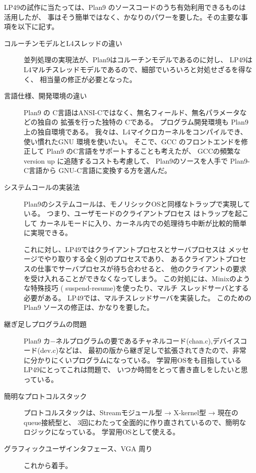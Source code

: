    LP49の試作に当たっては、Plan9 のソースコードのうち有効利用できるものは活用したが、
   事はそう簡単ではなく、かなりのパワーを要した。その主要な事項を以下に記す。
    

\begin{description}
\item[コルーチンモデルとL4スレッドの違い]
      並列処理の実現法が、Plan9はコルーチンモデルであるのに対し、
      LP49はL4マルチスレッドモデルであるので、細部でいろいろと対処せざるを得なく、
      相当量の修正が必要となった。
    
\item[言語仕様、開発環境の違い]
      Plan9 の C言語はANSI-Cではなく、無名フィールド、無名パラメータなどの独自の
      拡張を行った独特の Cである。
    プログラム開発環境も Plan9 上の独自環境である。
    我々は、L4マイクロカーネルをコンパイルでき、使い慣れたGNU 環境を使いたい。
    そこで、GCC のフロントエンドを修正して Plan9 のC言語をサポートすることも考えたが、
    GCCの頻繁な version up に追随するコストも考慮して、
    Plan9のソースを人手で Plan9-C言語から GNU-C言語に変換する方を選んだ。
    
\item[システムコールの実装法]
      Plan9のシステムコールは、モノリシックOSと同様なトラップで実現している。
      つまり、ユーザモードのクライアントプロセス はトラップを起こして
      カーネルモードに入り、カーネル内での処理待ち中断が比較的簡単に実現できる。

    これに対し、LP49ではクライアントプロセスとサーバプロセスは
    メッセージでやり取りする全く別のプロセスであり、
    あるクライアントプロセスの仕事でサーバプロセスが待ち合わせると、
    他のクライアントの要求を受け入れることができなくなってしまう。
    この対処には、Minixのような特殊技巧 ( suspend-resume)を使ったり、マルチ
    スレッドサーバとする必要がある。
    LP49では、マルチスレッドサーバを実装した。
    このための Plan9 ソースの修正は、かなりを要した。

    
\item[継ぎ足しプログラムの問題]
      Plan9 カ−ネルプログラムの要であるチャネルコード(chan.c),デバイスコード(dev.c)などは、
最初の版から継ぎ足しで拡張されてきたので、非常に分かりにくいプログラムになっている。
学習用OSをも目指しているLP49にとってこれは問題で、
いつか時間をとって書き直しをしたいと思っている。

\item[簡明なプロトコルスタック]
      プロトコルスタックは、Streamモジュール型 → X-kernel型 → 現在の queue接続型と、
      3回にわたって全面的に作り直されているので、簡明なロジックになっている。
      学習用OSとして使える。

\item[グラフィックユーザインタフェース、VGA 周り]
    これから着手。
\end{description}




